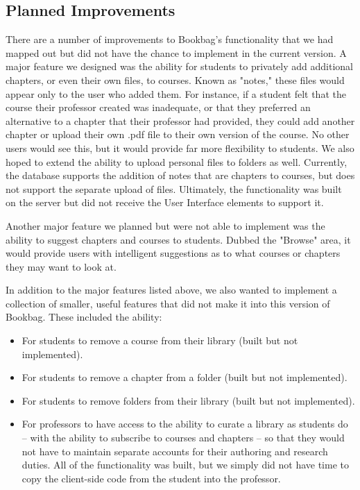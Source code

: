 \documentclass[pageno]{jpaper}
\begin{document}
\subsection{Planned Improvements}
There are a number of improvements to Bookbag's functionality that we had mapped out but did not have the chance to implement in the current version. A major feature we designed was the ability for students to privately add additional chapters, or even their own files, to courses. Known as "notes," these files would appear only to the user who added them. For instance, if a student felt that the course their professor created was inadequate, or that they preferred an alternative to a chapter that their professor had provided, they could add another chapter or upload their own .pdf file to their own version of the course. No other users would see this, but it would provide far more flexibility to students. We also hoped to extend the ability to upload personal files to folders as well. Currently, the database supports the addition of notes that are chapters to courses, but does not support the separate upload of files. Ultimately, the functionality was built on the server but did not receive the User Interface elements to support it.

Another major feature we planned but were not able to implement was the ability to suggest chapters and courses to students. Dubbed the "Browse" area, it would provide users with intelligent suggestions as to what courses or chapters they may want to look at. 

In addition to the major features listed above, we also wanted to implement a collection of smaller, useful features that did not make it into this version of Bookbag. These included the ability:

\begin{itemize}
    \item For students to remove a course from their library (built but not implemented).
    \item For students to remove a chapter from a folder (built but not implemented).
    \item For students to remove folders from their library (built but not implemented).
    \item For professors to have access to the ability to curate a library as students do – with the ability to subscribe to courses and chapters – so that they would not have to maintain separate accounts for their authoring and research duties. All of the functionality was built, but we simply did not have time to copy the client-side code from the student into the professor.
\end{itemize}
\end{document}
